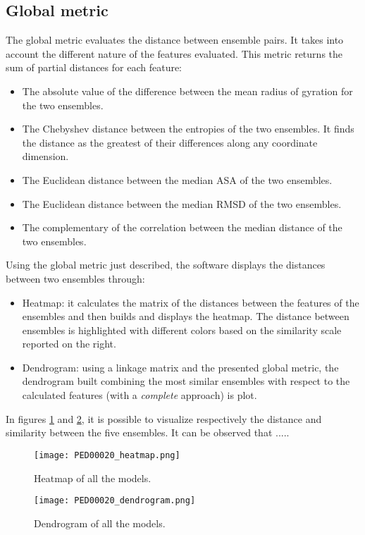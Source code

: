\subsection{Global metric}
The global metric evaluates the distance between ensemble pairs. It takes into account the different nature of the features evaluated.
This metric returns the sum of partial distances for each feature:
\begin{itemize}
\item The absolute value of the difference between the mean radius of gyration for the two ensembles.
\item The Chebyshev distance between the entropies of the two ensembles. It finds the distance as the greatest of their differences along any coordinate dimension.
\item The Euclidean distance between the median ASA of the two ensembles.
\item The Euclidean distance between the median RMSD of the two ensembles.
\item The complementary of the correlation between the median distance of the two ensembles.
\end{itemize}


Using the global metric just described, the software displays the distances between two ensembles through:
\begin{itemize}
\item Heatmap: it calculates the matrix of the distances between the features of the ensembles and then builds and displays the heatmap. The distance between ensembles is highlighted with different colors based on the similarity scale reported on the right. 
\item Dendrogram: using a linkage matrix and the presented global metric, the dendrogram built combining the most similar ensembles with respect to the calculated features (with a \emph{complete} approach) is plot.
\end{itemize}

In figures \ref{heatmap} and \ref{dendrogram}, it is possible to visualize respectively the distance and similarity between the five ensembles. It can be observed that .....

\begin{figure}[H]
	\begin{minipage}[b]{0.93\textwidth}
		\centering
		\texttt{[image: PED00020\_heatmap.png]}
		\caption{Heatmap of all the models.}
		\label{heatmap}
	\end{minipage}
\end{figure}
\begin{figure}[H]
	\begin{minipage}[b]{0.93\textwidth}
		\centering
		\texttt{[image: PED00020\_dendrogram.png]}
		\caption{Dendrogram of all the models.}
		\label{dendrogram}
	\end{minipage}
\end{figure}


